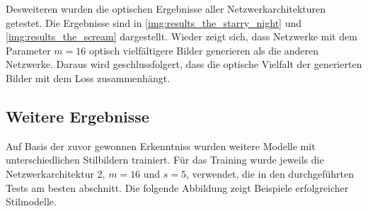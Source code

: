 Desweiteren wurden die optischen Ergebnisse aller Netzwerkarchitekturen getestet. Die Ergebnisse sind in \ref{img:results_the_starry_night} und \ref{img:results_the_scream} dargestellt. Wieder zeigt sich, dass Netzwerke mit dem Parameter $ m = 16 $ optisch vielfältigere Bilder generieren als die anderen Netzwerke. Daraus wird geschlussfolgert, dass die optische Vielfalt der generierten Bilder mit dem Loss zusammenhängt.

\subsection{Weitere Ergebnisse}

Auf Basis der zuvor gewonnen Erkenntniss wurden weitere Modelle mit unterschiedlichen Stilbildern trainiert. Für das Training wurde jeweils die Netzwerkarchitektur 2, $ m = 16 $ und $ s = 5 $, verwendet, die in den durchgeführten Tests am besten abschnitt. Die folgende Abbildung zeigt Beispiele erfolgreicher Stilmodelle.

\pagebreak

